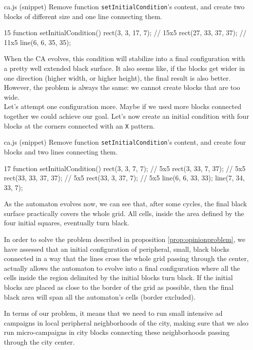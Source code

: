 \begin{programcode}{ca.js (snippet)}
Remove function \texttt{setInitialCondition}'s content, and create two blocks of different size and one
line connecting them.
\begin{codeh1}{1}{5}
function setInitialCondition() {
  rect(3, 3, 17, 7); // 15x5
  rect(27, 33, 37, 37); // 11x5
  line(6, 6, 35, 35);
}
\end{codeh1}
\end{programcode}

When the CA evolves, this condition will stabilize into a final configuration with a pretty well
extended black surface. It also seems like, if the blocks get wider in one direction
(higher width, or higher height), the final result is also better. However, the problem is always the same:
we cannot create blocks that are too wide.\\

Let's attempt one configuration more. Maybe if we used more blocks connected together we could achieve
our goal. Let's now create an initial condition with four blocks at the corners connected with
an \texttt{X} pattern.

\begin{programcode}{ca.js (snippet)}
Remove function \texttt{setInitialCondition}'s content, and create four blocks and two
lines connecting them.
\begin{codeh1}{1}{7}
function setInitialCondition() {
  rect(3, 3, 7, 7); // 5x5
  rect(3, 33, 7, 37); // 5x5
  rect(33, 33, 37, 37); // 5x5
  rect(33, 3, 37, 7); // 5x5
  line(6, 6, 33, 33);
  line(7, 34, 33, 7);
}
\end{codeh1}
\end{programcode}

As the automaton evolves now, we can see that, after some cycles, the final black surface practically covers the whole
grid. All cells, inside the area defined by the four initial squares, eventually turn black.

\begin{proposition}
\label{prop:sol}
In order to solve the problem described in proposition \ref{prop:opinionproblem}, we have assessed that an
initial configuration of peripheral, small, black blocks connected in a way that the lines cross the whole grid
passing through the center, actually allows the automaton to evolve into a final configuration where all the cells
inside the region delimited by the initial blocks turn black. If the initial blocks are placed as close to the border
of the grid as possible, then the final black area will span all the automaton's cells (border excluded).

In terms of our problem, it means that we need to run small intensive ad campaigns in local peripheral neighborhoods
of the city, making sure that we also run micro-campaigns in city blocks connecting these neighborhoods passing through
the city center.
\end{proposition}

